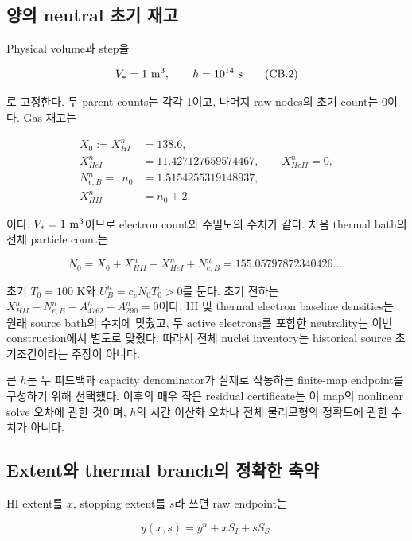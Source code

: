 \documentclass[11pt,a4paper]{article}
\begin{document}
\hypertarget{uxc591uxc758-neutral-uxcd08uxae30-uxc7acuxace0}{%
\subsection{양의 neutral 초기 재고}\label{uxc591uxc758-neutral-uxcd08uxae30-uxc7acuxace0}}

Physical volume과 step을

\[
 V_*=1\ {\rm m^3},\qquad h=10^{14}\ {\rm s}
 \tag{CB.2}
\]

로 고정한다. 두 parent counts는 각각 1이고, 나머지 raw nodes의 초기 count는 0이다. Gas 재고는

\[
 \begin{aligned}
 X_0:=X_{HI}^n&=138.6,\\
 X_{HeI}^n&=11.427127659574467,\qquad X_{HeII}^n=0,\\
 N_{e,B}^n=:n_0&=1.5154255319148937,\\
 X_{HII}^n&=n_0+2.
 \end{aligned}\tag{CB.3}
\]

이다. \(V_*=1\ {\rm m^3}\)이므로 electron count와 수밀도의 수치가 같다. 처음 thermal bath의 전체 particle count는

\[
 N_0=X_0+X_{HII}^n+X_{HeI}^n+N_{e,B}^n
      =155.05797872340426\ldots .
 \tag{CB.4}
\]

초기 \(T_0=100\) K와 \(U_B^n=c_vN_0T_0>0\)를 둔다. 초기 전하는 \(X_{HII}^n-N_{e,B}^n-A_{4762}^n-A_{290}^n=0\)이다. HI 및 thermal electron baseline densities는 원래 source bath의 수치에 맞췄고, 두 active electrons를 포함한 neutrality는 이번 construction에서 별도로 맞췄다. 따라서 전체 nuclei inventory는 historical source 초기조건이라는 주장이 아니다.

큰 \(h\)는 두 피드백과 capacity denominator가 실제로 작동하는 finite-map endpoint를 구성하기 위해 선택했다. 이후의 매우 작은 residual certificate는 이 map의 nonlinear solve 오차에 관한 것이며, \(h\)의 시간 이산화 오차나 전체 물리모형의 정확도에 관한 수치가 아니다.

\hypertarget{extentuxc640-thermal-branchuxc758-uxc815uxd655uxd55c-uxcd95uxc57d}{%
\subsection{Extent와 thermal branch의 정확한 축약}\label{extentuxc640-thermal-branchuxc758-uxc815uxd655uxd55c-uxcd95uxc57d}}

HI extent를 \(x\), stopping extent를 \(s\)라 쓰면 raw endpoint는

\[
 y(x,s)=y^n+xS_I+sS_S.
 \tag{CB.5}
\]
\end{document}
